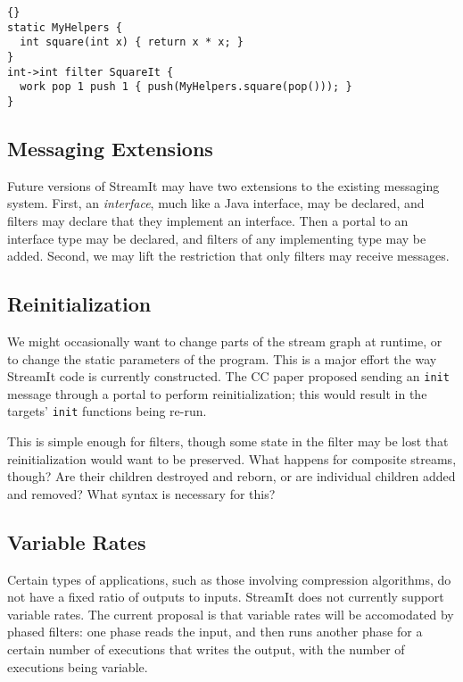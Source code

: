 \begin{lstlisting}{}
static MyHelpers {
  int square(int x) { return x * x; }
}
int->int filter SquareIt {
  work pop 1 push 1 { push(MyHelpers.square(pop())); }
}
\end{lstlisting}

\subsection{Messaging Extensions}

Future versions of StreamIt may have two extensions to the existing
messaging system.  First, an \emph{interface}, much like a Java
interface, may be declared, and filters may declare that they
implement an interface.  Then a portal to an interface type may be
declared, and filters of any implementing type may be added.  Second,
we may lift the restriction that only filters may receive messages.

\subsection{Reinitialization}

We might occasionally want to change parts of the stream graph at
runtime, or to change the static parameters of the program.  This is a
major effort the way StreamIt code is currently constructed.  The CC
paper proposed sending an \lstinline|init| message through a portal to
perform reinitialization; this would result in the targets'
\lstinline|init| functions being re-run.

This is simple enough for filters, though some state in the filter may
be lost that reinitialization would want to be preserved.  What
happens for composite streams, though?  Are their children destroyed
and reborn, or are individual children added and removed?  What syntax
is necessary for this?

\subsection{Variable Rates}

Certain types of applications, such as those involving compression
algorithms, do not have a fixed ratio of outputs to inputs.  StreamIt
does not currently support variable rates.  The current proposal is
that variable rates will be accomodated by phased filters: one phase
reads the input, and then runs another phase for a certain number of
executions that writes the output, with the number of executions being
variable.

